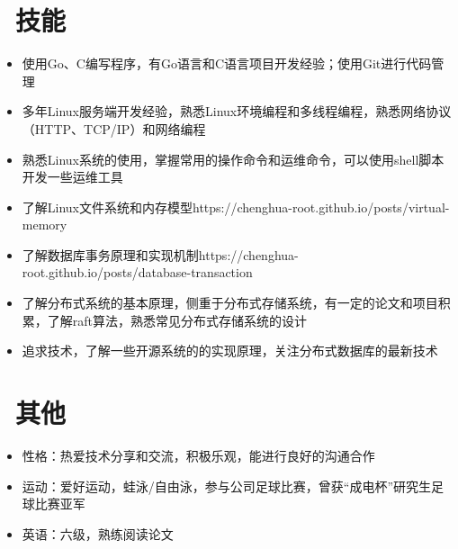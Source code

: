 \documentclass{resume}
\begin{document}
\section{\faCogs\  技能}
\begin{itemize}[parsep=0.5ex]
  \item 使用Go、C编写程序，有Go语言和C语言项目开发经验；使用Git进行代码管理
  \item 多年Linux服务端开发经验，熟悉Linux环境编程和多线程编程，熟悉网络协议（HTTP、TCP/IP）和网络编程
  \item 熟悉Linux系统的使用，掌握常用的操作命令和运维命令，可以使用shell脚本开发一些运维工具
  \item 了解Linux文件系统和内存模型https://chenghua-root.github.io/posts/virtual-memory
  \item 了解数据库事务原理和实现机制https://chenghua-root.github.io/posts/database-transaction
  \item 了解分布式系统的基本原理，侧重于分布式存储系统，有一定的论文和项目积累，了解raft算法，熟悉常见分布式存储系统的设计
  \item 追求技术，了解一些开源系统的的实现原理，关注分布式数据库的最新技术
\end{itemize}

\section{\faInfo\  其他}
\begin{itemize}[parsep=0.5ex]
  \item 性格：热爱技术分享和交流，积极乐观，能进行良好的沟通合作
  \item 运动：爱好运动，蛙泳/自由泳，参与公司足球比赛，曾获“成电杯”研究生足球比赛亚军
  \item 英语：六级，熟练阅读论文
\end{itemize}

%
%
\end{document}
